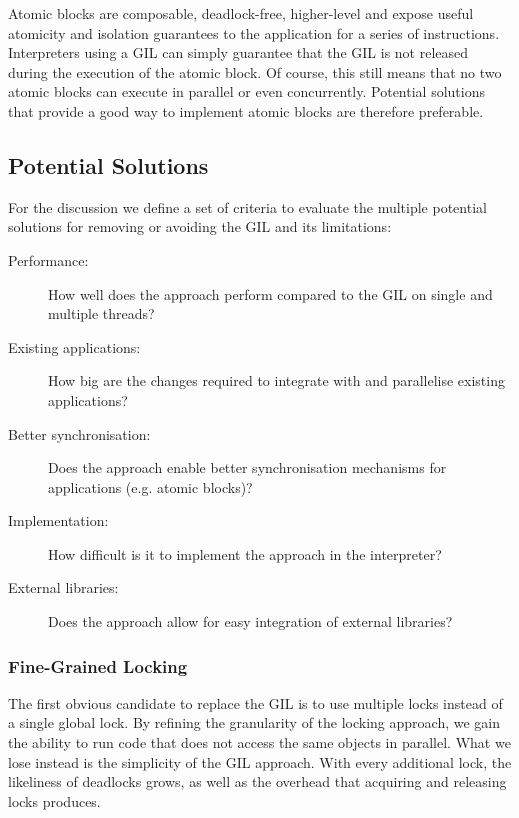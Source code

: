 \documentclass{sigplanconf}
\begin{document}
Atomic blocks are composable, deadlock-free, higher-level and expose
useful atomicity and isolation guarantees to the application for a
series of instructions.  Interpreters using a GIL can simply guarantee
that the GIL is not released during the execution of the atomic
block. Of course, this still means that no two atomic blocks can
execute in parallel or even concurrently. Potential solutions that
provide a good way to implement atomic blocks are therefore
preferable.



\subsection{Potential Solutions}

For the discussion we define a set of criteria to evaluate the
multiple potential solutions for removing or avoiding the GIL and its
limitations:

\begin{description}
\item[Performance:] How well does the approach perform compared to the
  GIL on single and multiple threads?
\item[Existing applications:] How big are the changes required to
  integrate with and parallelise existing applications?
\item[Better synchronisation:] Does the approach enable better
  synchronisation mechanisms for applications (e.g. atomic blocks)?
\item[Implementation:] How difficult is it to implement the approach
  in the interpreter?
\item[External libraries:] Does the approach allow for easy
  integration of external libraries?
\end{description}


\subsubsection{Fine-Grained Locking}

The first obvious candidate to replace the GIL is to use multiple
locks instead of a single global lock. By refining the granularity of
the locking approach, we gain the ability to run code that does not
access the same objects in parallel. What we lose instead is the
simplicity of the GIL approach. With every additional lock, the
likeliness of deadlocks grows, as well as the overhead that acquiring
and releasing locks produces.
\end{document}
